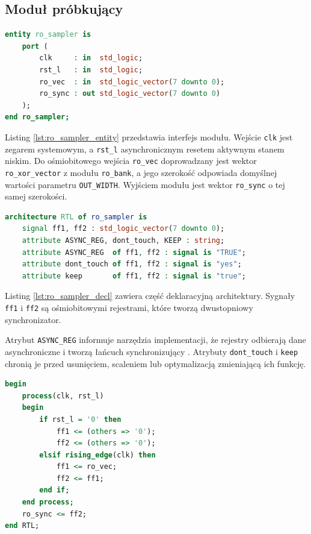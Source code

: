 \subsection{Moduł próbkujący}

\begin{lstlisting}[language=VHDL,
caption={Jednostka \texttt{ro\_sampler} (\texttt{ro\_sampler.vhdl})},
label={lst:ro_sampler_entity}]
entity ro_sampler is
    port (
        clk     : in  std_logic;
        rst_l   : in  std_logic;
        ro_vec  : in  std_logic_vector(7 downto 0);
        ro_sync : out std_logic_vector(7 downto 0)
    );
end ro_sampler;
\end{lstlisting}

Listing \ref{lst:ro_sampler_entity} przedstawia interfejs modułu. Wejście
\texttt{clk} jest zegarem systemowym, a \texttt{rst\_l} asynchronicznym
resetem aktywnym stanem niskim. Do ośmiobitowego wejścia \texttt{ro\_vec}
doprowadzany jest wektor \texttt{ro\_xor\_vector} z modułu \texttt{ro\_bank},
a jego szerokość odpowiada domyślnej wartości parametru \texttt{OUT\_WIDTH}.
Wyjściem modułu jest wektor \texttt{ro\_sync} o tej samej szerokości.

\begin{lstlisting}[language=VHDL,
caption={Rejestry i atrybuty architektury \texttt{ro\_sampler} (\texttt{ro\_sampler.vhdl})},
label={lst:ro_sampler_decl}]
architecture RTL of ro_sampler is
    signal ff1, ff2 : std_logic_vector(7 downto 0);
    attribute ASYNC_REG, dont_touch, KEEP : string;
    attribute ASYNC_REG  of ff1, ff2 : signal is "TRUE";
    attribute dont_touch of ff1, ff2 : signal is "yes";
    attribute keep       of ff1, ff2 : signal is "true";
\end{lstlisting}

Listing \ref{lst:ro_sampler_decl} zawiera część deklaracyjną architektury.
Sygnały \texttt{ff1} i \texttt{ff2} są ośmiobitowymi rejestrami, które tworzą
dwustopniowy synchronizator.

Atrybut \texttt{ASYNC\_REG} informuje narzędzia implementacji, że rejestry
odbierają dane asynchroniczne i tworzą łańcuch synchronizujący
\cite{amd_vivado_asyncreg}. Atrybuty \texttt{dont\_touch} i \texttt{keep}
chronią je przed usunięciem, scaleniem lub optymalizacją zmieniającą ich
funkcję.

\begin{lstlisting}[language=VHDL,
caption={Proces próbkujący w architekturze \texttt{ro\_sampler} (\texttt{ro\_sampler.vhdl})},
label={lst:ro_sampler_body}]
begin
    process(clk, rst_l)
    begin
        if rst_l = '0' then
            ff1 <= (others => '0');
            ff2 <= (others => '0');
        elsif rising_edge(clk) then
            ff1 <= ro_vec;
            ff2 <= ff1;
        end if;
    end process;
    ro_sync <= ff2;
end RTL;
\end{lstlisting}

